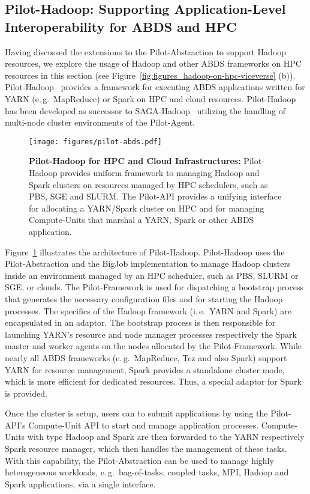 \documentclass{sig-alternate}
\newcommand{\pilot}{Pilot\xspace}
\newcommand{\computeunit}{Compute-Unit\xspace}
\newcommand{\computeunits}{Compute-Units\xspace}
\begin{document}
\subsection{Pilot-Hadoop: Supporting Application-Level Interoperability for ABDS and HPC}
\label{sec:pilot_hadoop}

Having discussed the extensions to the \pilot-Abstraction to support Hadoop
resources, we explore the usage of Hadoop and other ABDS frameworks on HPC
resources in this section (see Figure~\ref{fig:figures_hadoop-on-hpc-viceverse}
(b)). \pilot-Hadoop~\cite{pilot-hadoop} provides a framework for executing ABDS
applications written for YARN (e.\,g.\ MapReduce) or Spark on HPC and cloud
resources. Pilot-Hadoop has been developed as successor to
SAGA-Hadoop~\cite{saga-hadoop} utilizing the handling of multi-node cluster
environments of the \pilot-Agent.

\begin{figure}[t]
    \centering
\texttt{[image: figures/pilot-abds.pdf]}
    \caption{\textbf{Pilot-Hadoop for HPC and Cloud Infrastructures:} 
    \pilot-Hadoop provides  uniform framework to managing Hadoop and Spark 
    clusters on resources managed by HPC schedulers, such as PBS, SGE and 
    SLURM. The \pilot-API provides a unifying interface for allocating a 
    YARN/Spark cluster on HPC and for managing \computeunits that marshal a 
    YARN, Spark or other ABDS application.}
    \label{fig:figures_pilot_abds}
\end{figure}

Figure~\ref{fig:figures_pilot_abds} illustrates the architecture of
\pilot-Hadoop. Pilot-Hadoop uses the \pilot-Abstraction and the
BigJob implementation to manage Hadoop clusters inside an environment managed
by an HPC scheduler, such as PBS, SLURM or SGE, or clouds. The \pilot-Framework
is used for dispatching a bootstrap process that generates the necessary
configuration files and for starting the Hadoop processes. The specifics of the
Hadoop framework (i.\,e.\ YARN and Spark) are encapsulated in an adaptor. The
bootstrap process is then responsible for launching YARN's resource and node
manager processes respectively the Spark master and worker agents on the nodes
allocated by the \pilot-Framework. While nearly all ABDS
frameworks (e.\,g.\ MapReduce, Tez and also Spark) support YARN for resource
management, Spark provides a standalone cluster mode,
which is more efficient for dedicated resources. Thus, a special adaptor for 
Spark is provided. 

Once the cluster is setup, users can to submit applications by using the
Pilot-API's \computeunit API to start and manage application processes.
\computeunits with type Hadoop and Spark are then forwarded to the YARN
respectively Spark resource manager, which then handles the management of these
tasks. With this capability, the \pilot-Abstraction can be used to manage
highly heterogeneous workloads, e.\,g.\ bag-of-tasks, coupled tasks, MPI,
Hadoop and Spark applications, via a single interface.
\end{document}
